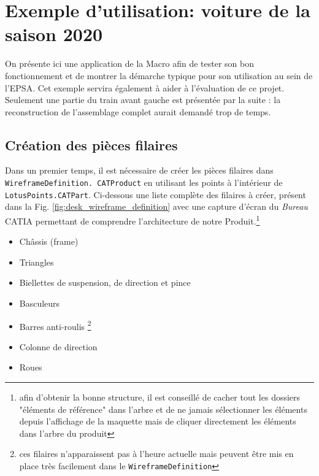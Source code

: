 \section{Exemple d'utilisation: voiture de la saison 2020}

\par On présente ici une application de la Macro afin de tester son bon fonctionnement et de montrer la démarche typique pour son utilisation au sein de l'EPSA. Cet exemple servira également à aider à l'évaluation de ce projet. Seulement une partie du train avant gauche est présentée par la suite : la reconstruction de l'assemblage complet aurait demandé trop de temps. 

\subsection{Création des pièces filaires} %

\par Dans un premier temps, il est nécessaire de créer les pièces filaires dans  \texttt{WireframeDefinition. CATProduct} en utilisant les points à l'intérieur de \texttt{LotusPoints.CATPart}. Ci-dessous une liste complète des filaires à créer, présent dans la Fig. \ref{fig:desk_wireframe_definition} avec une capture d'écran du \textit{Bureau} CATIA permettant de comprendre l'architecture de notre Produit.\footnote{afin d'obtenir la bonne structure, il est conseillé de cacher tout les dossiers "éléments de référence" dans l'arbre et de ne jamais sélectionner les éléments depuis l'affichage de la maquette mais de cliquer directement les éléments dans l'arbre du produit}
\begin{itemize}
    \item Châssis (frame)
    \item Triangles
    \item Biellettes de suspension, de direction et pince
    \item Basculeurs
    \item Barres anti-roulis \footnote{ces filaires n'apparaissent pas à l'heure actuelle mais peuvent être mis en place très facilement dans le \texttt{WireframeDefinition} }
    \item Colonne de direction
    \item Roues
\end{itemize}

